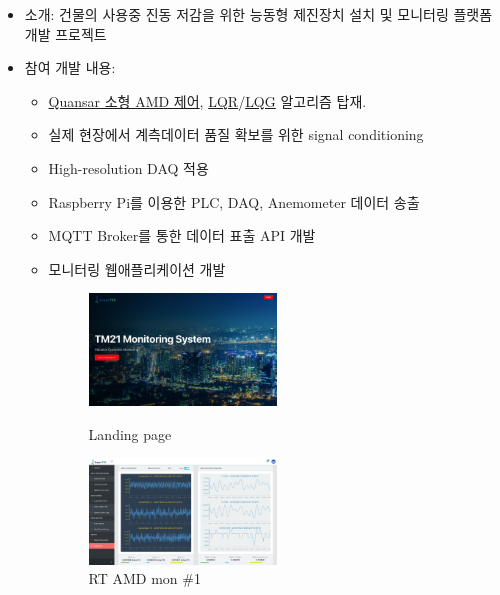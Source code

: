 \begin{itemize}[label=]
	\item 소개: 건물의 사용중 진동 저감을 위한 능동형 제진장치 설치 및 모니터링 플랫폼 개발 프로젝트
	\item 참여 개발 내용:
	      \begin{itemize}[label=]
		      \item \href{http://www.quanser.com/products/active_mass_damper}{Quansar 소형 AMD 제어}, \href{https://en.wikipedia.org/wiki/Linear-quadratic_regulator}{LQR}/\href{https://en.wikipedia.org/wiki/Linear-quadratic-Gaussian_control}{LQG} 알고리즘 탑재.
		      \item 실제 현장에서 계측데이터 품질 확보를 위한 signal conditioning
		      \item High-resolution DAQ 적용
		      \item Raspberry Pi를 이용한 PLC, DAQ, Anemometer 데이터 송출
		      \item MQTT Broker를 통한 데이터 표출 API 개발
		      \item 모니터링 웹애플리케이션 개발
		            \begin{figure}[!ht]
			            \begin{fullwidth}
				            \parbox{0.5\textwidth}{
					            \centering
					            \includegraphics[width=0.5\textwidth]{images/TM21 Vibration Controller Monitroing - landing.png}
					            \caption*{Landing page}
				            }\qquad
				            \parbox{0.5\textwidth}{
					            \centering
					            \includegraphics[width=0.5\textwidth]{images/TM21 Vibration Controller Monitroing - amd1}
					            \caption*{RT AMD mon \#1}
				            }\qquad

\end{fullwidth}
\end{figure}
\end{itemize}
\end{itemize}
